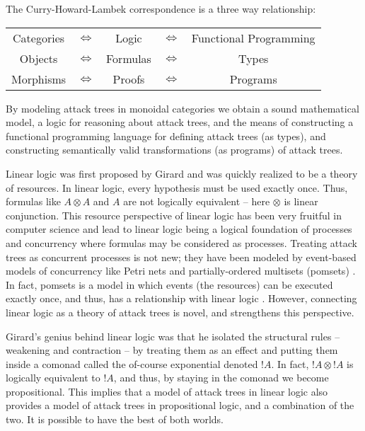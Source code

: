 \documentclass{llncs}
\begin{document}
The Curry-Howard-Lambek correspondence is a three way relationship:
\begin{center}
  \footnotesize
  \setlength{\tabcolsep}{7pt}
  \begin{tabular}{ccccc}
    Categories & $\iff$ & Logic    & $\iff$   & Functional Programming\\
    Objects    & $\iff$ & Formulas & $\iff$   & Types    \\
    Morphisms  & $\iff$ & Proofs   & $\iff$   & Programs 
  \end{tabular}
\end{center}
By modeling attack trees in monoidal categories we obtain a sound
mathematical model, a logic for reasoning about attack trees, and the
means of constructing a functional programming language for defining
attack trees (as types), and constructing semantically valid
transformations (as programs) of attack trees.  

Linear logic was first proposed by Girard \cite{Girard:1987} and was
quickly realized to be a theory of resources.  In linear logic, every
hypothesis must be used exactly once.  Thus, formulas like $A \otimes
A$ and $A$ are not logically equivalent -- here $\otimes$ is linear
conjunction.  This resource perspective of linear logic has been very
fruitful in computer science and lead to linear logic being a logical
foundation of processes and concurrency where formulas may be
considered as processes.  Treating attack trees as concurrent
processes is not new; they have been modeled by event-based models of
concurrency like Petri nets and partially-ordered multisets (pomsets)
\cite{Jhawar:2015,Mauw:2006}.  In fact, pomsets is a model in which
events (the resources) can be executed exactly once, and thus, has a
relationship with linear logic \cite{Retore:1997}.  However,
connecting linear logic as a theory of attack trees is novel, and
strengthens this perspective.

Girard's genius behind linear logic was that he isolated the
structural rules -- weakening and contraction -- by treating them as
an effect and putting them inside a comonad called the of-course
exponential denoted $!A$.  In fact, $!A \otimes !A$ is logically
equivalent to $!A$, and thus, by staying in the comonad we become
propositional.  This implies that a model of attack trees in linear
logic also provides a model of attack trees in propositional logic,
and a combination of the two.  It is possible to have the best of both
worlds.
\end{document}
